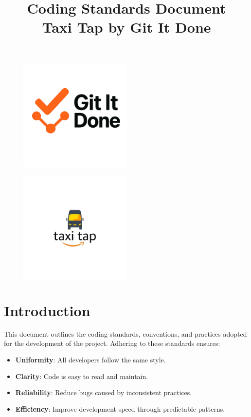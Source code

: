 \documentclass[a4paper,12pt]{article}
\title{Coding Standards Document\\Taxi Tap by Git It Done}
\date{}
\begin{document}
\maketitle

\begin{figure}[H]
  \centering
  \includegraphics[width=0.5\textwidth]{LogoGroup.png} 
\end{figure}

\begin{figure}[H]
  \centering
  \includegraphics[width=0.5\textwidth]{LogoTaxiTap.png} 
\end{figure}

\newpage

\tableofcontents
\newpage

\section{Introduction}
This document outlines the coding standards, conventions, and practices adopted for the development of the project. Adhering to these standards ensures:

\begin{itemize}
\item \textbf{Uniformity}: All developers follow the same style.
\item \textbf{Clarity}: Code is easy to read and maintain.
\item \textbf{Reliability}: Reduce bugs caused by inconsistent practices.
\item \textbf{Efficiency}: Improve development speed through predictable patterns.
\end{itemize}
\end{document}
